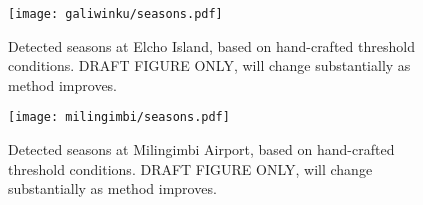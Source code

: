 \begin{figure}[p]
    \centering
    \texttt{[image: galiwinku/seasons.pdf]}
    \caption[Detected seasons for Elcho Island]{
        Detected seasons at Elcho Island, based on hand-crafted threshold conditions.
        DRAFT FIGURE ONLY, will change substantially as method improves.
        }
    \label{fig:galiwinku-seasons}
\end{figure}
\begin{figure}[p]
    \centering
    \texttt{[image: milingimbi/seasons.pdf]}
    \caption[Detected seasons for Milingimbi Airport]{
        Detected seasons at Milingimbi Airport, based on hand-crafted threshold conditions.
        DRAFT FIGURE ONLY, will change substantially as method improves.
        }
    \label{fig:milingimbi-seasons}
\end{figure}



